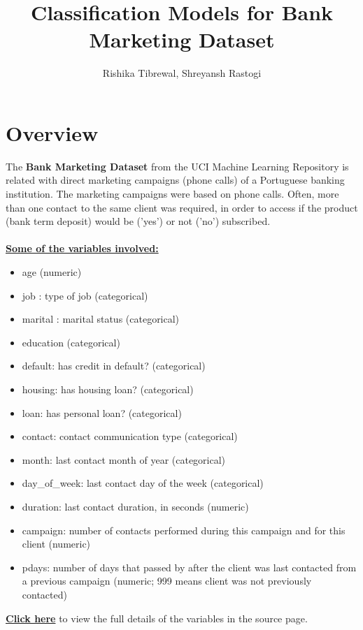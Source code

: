 \documentclass{article}
\begin{document}
\title{\textbf{Classification Models for Bank Marketing Dataset}}
\author{Rishika Tibrewal, 
Shreyansh Rastogi}
\maketitle
\section{Overview}
The \textbf{Bank Marketing Dataset} from the UCI Machine Learning Repository is related with direct marketing campaigns (phone calls) of a Portuguese banking institution.
The marketing campaigns were based on phone calls. Often, more than one contact to the same client was required, in order to access if the product (bank term deposit) would be ('yes') or not ('no') subscribed.
\\
\\
\underline{\textbf{Some of the variables involved:}}
\begin{itemize}
\item age (numeric) 
\item job : type of job (categorical)
\item marital : marital status (categorical) 
\item education (categorical)
\item default: has credit in default? (categorical) 
\item housing: has housing loan? (categorical) 
\item loan: has personal loan? (categorical) 
\item contact: contact communication type (categorical) 
\item month: last contact month of year (categorical) 
\item day\_of\_week: last contact day of the week (categorical)
\item duration: last contact duration, in seconds (numeric)
\item campaign: number of contacts performed during this campaign and for this client (numeric) 
\item pdays: number of days that passed by after the client was last contacted from a previous campaign (numeric; 999 means client was not previously contacted)
\\
\end{itemize}
\href{https://archive.ics.uci.edu/ml/datasets/Bank+Marketing}{\textbf{Click here}} to view the full details of the variables in the source page.
\maketitle
\end{document}
